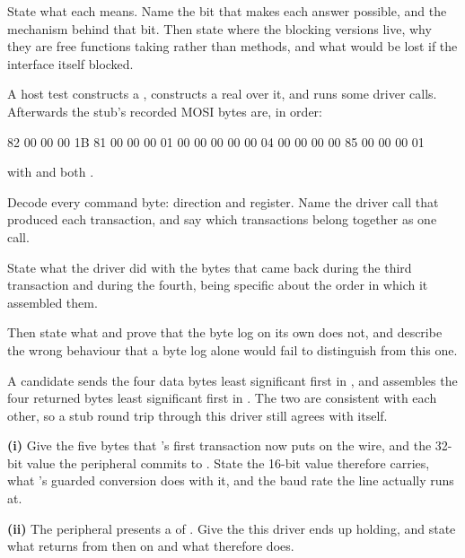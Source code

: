 State what each  means. Name the  bit that makes each answer possible, and
the  mechanism behind that bit. Then state where the blocking versions live, why they are
free functions taking  rather than methods, and what would be lost if the interface
itself blocked. 

\label{exa:q:6}

 A host test constructs a , constructs a real 
over it, and runs some driver calls. Afterwards the stub's recorded MOSI bytes are, in order:

\begin{console}
82 00 00 00 1B
81 00 00 00 01
00 00 00 00 00
04 00 00 00 00
85 00 00 00 01
\end{console}

\noindent with  and  both .

Decode every command byte: direction and register. Name the driver call that produced each
transaction, and say which transactions belong together as one call.

State what the driver did with the bytes that came back during the third transaction and during the
fourth, being specific about the order in which it assembled them.

Then state what  and  prove that the byte log on its own does
not, and describe the wrong behaviour that a byte log alone would fail to distinguish from this one.

 A candidate sends the four data bytes least significant first in , and
assembles the four returned bytes least significant first in . The two are consistent
with each other, so a stub round trip through this driver still agrees with itself.

\medskip\noindent\textbf{(i)} Give the five bytes that 's first transaction now
puts on the wire, and the 32-bit value the peripheral commits to . State the 16-bit
value  therefore carries, what 's guarded conversion does with it, and
the baud rate the line actually runs at. 

\medskip\noindent\textbf{(ii)} The peripheral presents a  of . Give
the  this driver ends up holding, and state what  returns from then on
and what  therefore does. 

